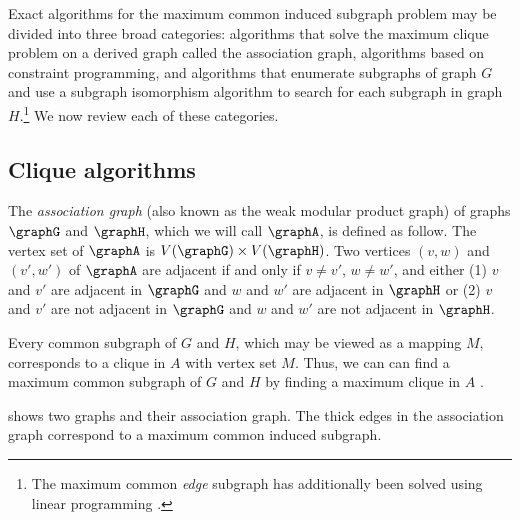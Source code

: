 Exact algorithms for the maximum common induced subgraph problem may be divided
into three broad categories: algorithms that solve the maximum clique problem
on a derived graph called the association graph, algorithms based on constraint
programming, and algorithms that enumerate subgraphs of graph $G$ and use a
subgraph isomorphism algorithm to search for each subgraph in graph
$H$.\footnote{The maximum common \emph{edge} subgraph has additionally been
solved using linear programming
\citep{marenco1999algoritmo,DBLP:journals/dam/BahienseMPS12}.} We now review
each of these categories.

\subsection{Clique algorithms}\label{subsec:clique-algorithms}

The \emph{association graph} (also known as the weak modular product graph)
of graphs $\graphG$ and $\graphH$, which we will call
$\graphA$, is defined as follow.  The vertex set of $\graphA$ is $V(\graphG)
\times V(\graphH)$.  Two vertices $(v,w)$ and $(v',w')$ of $\graphA$ are
adjacent if and only if $v \not= v'$, $w \not= w'$, and either (1) $v$ and $v'$
are adjacent in $\graphG$ and $w$ and $w'$ are adjacent in $\graphH$ or (2) $v$
and $v'$ are not adjacent in $\graphG$ and $w$ and $w'$ are not adjacent in
$\graphH$.

Every common subgraph of $G$ and $H$, which may be viewed as a mapping $M$,
corresponds to a clique in $A$ with vertex set $M$.  Thus, we can can find
a maximum common subgraph of $G$ and $H$ by finding a maximum clique in $A$
\citep{LeviG}.

 shows two graphs and their association graph.
The thick edges in the association graph correspond to a maximum common
induced subgraph.

